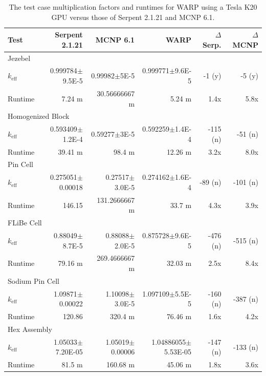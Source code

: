 \documentclass[preprint,12pt]{elsarticle}
\begin{document}
\begin{table}[h]
\centering
\caption{The test case multiplication factors and runtimes for WARP using a Tesla K20 GPU versus those of Serpent 2.1.21 and MCNP 6.1.}
\label{results_table_k20}
\footnotesize
\begin{tabular}{| l | r | r | r || r | r |}
\hline
Test & Serpent 2.1.21 & MCNP 6.1 & WARP & $\Delta$ Serp. & $\Delta$ MCNP  \\
\hline
\hline
\multicolumn{6}{|l|}{Jezebel} \\
\hline
$k_\mathrm{eff}$ & 0.999784$\pm$9.5E-5 &		0.99982$\pm$5E-5 &		0.999771$\pm$9.6E-5	 &	-1 (y) &		-5 (y)\\
\hline
Runtime & 7.24	 m  &		30.56666667 m 	 &		5.24 m 	 &		1.4x	& 5.8x  \\
\hline
\hline
\multicolumn{6}{|l|}{Homogenized Block }\\
\hline
$k_\mathrm{eff}$ & 0.593409$\pm$1.2E-4 &		0.59277$\pm$3E-5 &		0.592259$\pm$1.4E-4 &		-115	(n) &	-51 (n)  \\
\hline
Runtime & 39.41 m 	 &		98.4 m  &		12.26 m 	 &		3.2x &		8.0x \\
\hline
\hline
\multicolumn{6}{|l|}{Pin Cell}\\
\hline
$k_\mathrm{eff}$ & 	 0.275051$\pm$0.00018&		0.27517$\pm$3.0E-5	 &	0.274162$\pm$1.6E-4	 &	-89 (n)	 &	-101 (n) \\
\hline
Runtime & 	146.15 &		131.2666667 m 	 &		33.7 m  &			4.3x	 &	3.9x \\
\hline
\hline
\multicolumn{6}{|l|}{FLiBe Cell}\\
\hline
$k_\mathrm{eff}$ & 0.88049$\pm$8.7E-5	 &	0.88088$\pm$2.0E-5	 &	0.875728$\pm$9.6E-5	 &	-476 (n)	 &	-515  (n)\\
\hline
Runtime & 79.16 m 	 &		269.4666667 m 		 &	32.03 m 	 &		2.5x	 &	8.4x \\
\hline
\hline
\multicolumn{6}{|l|}{Sodium Pin Cell}\\
\hline
$k_\mathrm{eff}$ & 	1.09871$\pm$0.00022 &		1.10098$\pm$3.0E-5	 &	1.097109$\pm$5.5E-5	 &	-160 (n)&		-387 (n)\\
\hline
Runtime & 	120.86	 &	320.4 m 	 &		76.46 m  &			1.6x &		4.2x \\
\hline
\hline
\multicolumn{6}{|l|}{Hex Assembly}\\
\hline
$k_\mathrm{eff}$ & 1.05033$\pm$7.20E-05	 &	1.05019$\pm$0.00006	 &	1.04886055$\pm$5.53E-05	 &	-147 (n) & -133 (n) \\
\hline
Runtime & 81.5 m 		 &	160.68 m 	 &		45.06 m  &			1.8x	 &	3.6x \\
\hline
\end{tabular}
\end{table}
\end{document}
